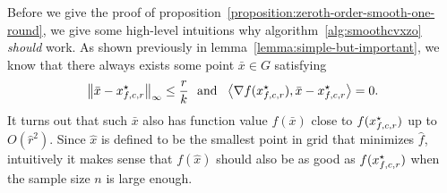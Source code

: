 \begin{remark}
Before we give the proof of proposition~\ref{proposition:zeroth-order-smooth-one-round}, 
we give some high-level intuitions why algorithm~\ref{alg:smoothcvxzo} \emph{should}
work. As shown previously in lemma~\ref{lemma:simple-but-important}, we know 
that there always exists some point $\bar{x} \in G$ satisfying 
\begin{equation*}
\left\|{\bar{x} - x_{f, c, r}^\star}\right\|_\infty \leq \frac{r}{k}
	~~\text{and}~~
		\left<\nabla f(x_{f, c, r}^\star), \bar{x} - x_{f, c, r}^\star\right> = 0.
\end{equation*}
It turns out that such $\bar{x}$ also has function value $f(\bar{x})$ close to 
$f(x_{f, c, r}^\star)$ up to $O(\hat{r}^2)$. Since $\hat{x}$ is defined to be the 
smallest point in grid that minimizes $\hat{f}$, intuitively it makes sense that 
$f(\hat{x})$ should also be as good as $f(x_{f, c, r}^\star)$ when the sample 
size $n$ is large enough. 
\end{remark}



